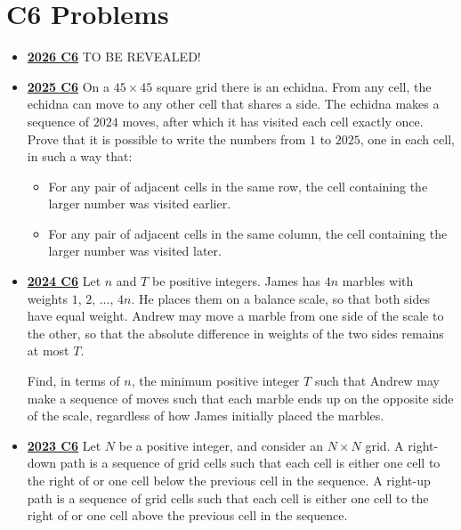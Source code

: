 \documentclass[11pt]{scrartcl}
\begin{document}
\section*{C6 Problems} \label{C6}
\begin{itemize}[leftmargin=*]


\item \href{https://www.imo-official.org/assets/documents/problems/2026/IMO2026SL.pdf}{\textbf{2026 C6}} TO BE REVEALED!


\item \href{https://artofproblemsolving.com/community/c6h3866845p38676929}{\textbf{2025 C6}} On a $45\times 45$ square grid there is an echidna. From any cell, the echidna can move to any other cell that shares a side. The echidna makes a sequence of $2024$ moves, after which it has visited each cell exactly once. Prove that it is possible to write the numbers from $1$ to $2025$, one in each cell, in such a way that:
    \begin{itemize}[leftmargin=*]
        \item[$\bullet$]  For any pair of adjacent cells in the same row, the cell containing the larger number was visited earlier.
\item[$\bullet$] For any pair of adjacent cells in the same column, the cell containing the larger number was visited later.

    \end{itemize}
\item \href{https://artofproblemsolving.com/community/c6h3610456p35340931}{\textbf{2024 C6}} Let $n$ and $T$ be positive integers. James has $4n$ marbles with weights $1$, $2$, $\dots$, $4n$. He places them on a balance scale, so that both sides have equal weight. Andrew may move a marble from one side of the scale to the other, so that the absolute difference in weights of the two sides remains at most $T$.

Find, in terms of $n$, the minimum positive integer $T$ such that Andrew may make a sequence of moves such that each marble ends up on the opposite side of the scale, regardless of how James initially placed the marbles.
\item \href{https://artofproblemsolving.com/community/c6h3359747p31218478}{\textbf{2023 C6}} Let $N$ be a positive integer, and consider an $N \times N$ grid. A right-down path is a sequence of grid cells such that each cell is either one cell to the right of or one cell below the previous cell in the sequence. A right-up path is a sequence of grid cells such that each cell is either one cell to the right of or one cell above the previous cell in the sequence.


\end{itemize}
\end{document}
